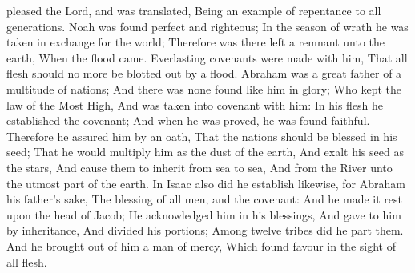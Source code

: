 pleased the Lord, and was translated, Being an example of repentance to all generations. Noah was found perfect and righteous; In the season of wrath he was taken in exchange for the world; Therefore was there left a remnant unto the earth, When the flood came. Everlasting covenants were made with him, That all flesh should no more be blotted out by a flood. Abraham was a great father of a multitude of nations; And there was none found like him in glory; Who kept the law of the Most High, And was taken into covenant with him: In his flesh he established the covenant; And when he was proved, he was found faithful. Therefore he assured him by an oath, That the nations should be blessed in his seed; That he would multiply him as the dust of the earth, And exalt his seed as the stars, And cause them to inherit from sea to sea, And from the River unto the utmost part of the earth. In Isaac also did he establish likewise, for Abraham his father’s sake, The blessing of all men, and the covenant: And he made it rest upon the head of Jacob; He acknowledged him in his blessings, And gave to him by inheritance, And divided his portions; Among twelve tribes did he part them. And he brought out of him a man of mercy, Which found favour in the sight of all flesh.



